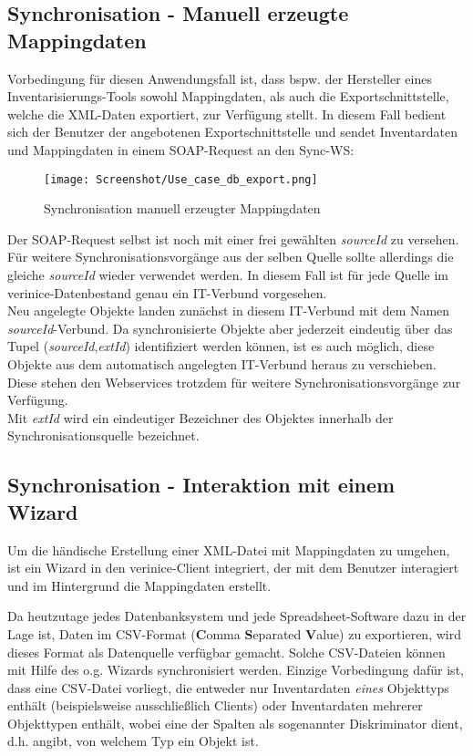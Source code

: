 \documentclass[a4paper,10pt]{book}
\begin{document}
\subsection{Synchronisation - Manuell erzeugte Mappingdaten}
Vorbedingung für diesen Anwendungsfall ist, dass bspw. der Hersteller eines Inventarisierungs-Tools sowohl
Mappingdaten, als auch die Exportschnittstelle, welche die XML-Daten exportiert, zur Verfügung stellt.
In diesem Fall bedient sich der Benutzer der angebotenen Exportschnittstelle und sendet Inventardaten und
Mappingdaten in einem SOAP-Request an den Sync-WS:
\newline
\begin{figure}[htb!]
  \centering
  \texttt{[image: Screenshot/Use\_case\_db\_export.png]}
  \caption{\label{Synchronisation manuell erzeugter Mappingdaten} Synchronisation manuell erzeugter Mappingdaten}
\end{figure}
\newline
Der SOAP-Request selbst ist noch mit einer frei gewählten \textit{sourceId} zu versehen. Für weitere
Synchronisationsvorgänge aus der selben Quelle sollte allerdings die gleiche \textit{sourceId} wieder verwendet werden.
In diesem Fall ist für jede Quelle im verinice-Datenbestand genau ein IT-Verbund vorgesehen.
\newline\\
Neu angelegte Objekte landen zunächst in diesem IT-Verbund mit dem Namen \textit{sourceId}-Verbund. Da synchronisierte
Objekte aber jederzeit eindeutig über das Tupel (\textit{sourceId},\textit{extId}) identifiziert werden können, ist es auch möglich,
diese Objekte aus dem automatisch angelegten IT-Verbund heraus zu verschieben. Diese stehen den Webservices trotzdem für weitere Synchronisationsvorgänge zur Verfügung.
\newline\\
Mit \textit{extId} wird ein eindeutiger Bezeichner des Objektes innerhalb der Synchronisationsquelle bezeichnet.

\subsection{Synchronisation - Interaktion mit einem Wizard}
Um die händische Erstellung einer XML-Datei mit Mappingdaten zu umgehen, ist ein
Wizard in den verinice-Client integriert, der mit dem Benutzer interagiert und
im Hintergrund die Mappingdaten erstellt.

Da heutzutage jedes Datenbanksystem und jede Spreadsheet-Software dazu in der
Lage ist, Daten im CSV-Format (\textbf{C}omma \textbf{S}eparated \textbf{V}alue)
zu exportieren, wird dieses Format als Datenquelle verfügbar gemacht. Solche
CSV-Dateien können mit Hilfe des o.g. Wizards synchronisiert werden. Einzige
Vorbedingung dafür ist, dass eine CSV-Datei vorliegt, die entweder nur
Inventardaten \textit{eines} Objekttyps enthält (beispielsweise ausschließlich
Clients) oder Inventardaten mehrerer Objekttypen enthält, wobei eine der Spalten
als sogenannter Diskriminator dient, d.h. angibt, von welchem Typ ein Objekt
ist.
\end{document}
